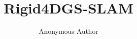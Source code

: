 \documentclass[letterpaper, 10 pt, conference]{ieeeconf}  %
\title{\LARGE \bf
Rigid4DGS-SLAM
}
\author{Anonymous Author%
}
\begin{document}
\maketitle
\thispagestyle{empty}
\pagestyle{empty}


\begin{abstract}


\end{abstract}
\end{document}
